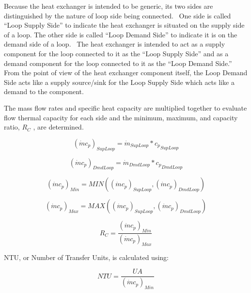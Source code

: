 Because the heat exchanger is intended to be generic, its two sides are distinguished by the nature of loop side being connected.~ One side is called ``Loop Supply Side'' to indicate the heat exchanger is situated on the supply side of a loop. The other side is called ``Loop Demand Side'' to indicate it is on the demand side of a loop.~ The heat exchanger is intended to act as a supply component for the loop connected to it as the ``Loop Supply Side'' and as a demand component for the loop connected to it as the ``Loop Demand Side.''~ From the point of view of the heat exchanger component itself, the Loop Demand Side acts like a supply source/sink for the Loop Supply Side which acts like a demand to the component.

The mass flow rates and specific heat capacity are multiplied together to evaluate flow thermal capacity for each side and the minimum, maximum, and capacity ratio, \({R_C}\) , are determined.

\begin{equation}
{\left( {\dot m{c_p}} \right)_{SupLoop}} = {\dot m_{SupLoop}}*{c_p}_{SupLoop}
\end{equation}

\begin{equation}
{\left( {\dot m{c_p}} \right)_{DmdLoop}} = {\dot m_{DmdLoop}}*{c_p}_{DmdLoop}
\end{equation}

\begin{equation}
{\left( {\dot m{c_p}} \right)_{Min}} = MIN\left( {{{\left( {\dot m{c_p}} \right)}_{SupLoop}},{{\left( {\dot m{c_p}} \right)}_{DmdLoop}}} \right)
\end{equation}

\begin{equation}
{\left( {\dot m{c_p}} \right)_{Max}} = MAX\left( {{{\left( {\dot m{c_p}} \right)}_{SupLoop}},{{\left( {\dot m{c_p}} \right)}_{DmdLoop}}} \right)
\end{equation}

\begin{equation}
{R_C} = \frac{{{{\left( {\dot m{c_p}} \right)}_{Min}}}}{{{{\left( {\dot m{c_p}} \right)}_{Max}}}}
\end{equation}

NTU, or Number of Transfer Units, is calculated using:

\begin{equation}
NTU = \frac{{UA}}{{{{\left( {\dot m{c_p}} \right)}_{Min}}}}
\end{equation}

